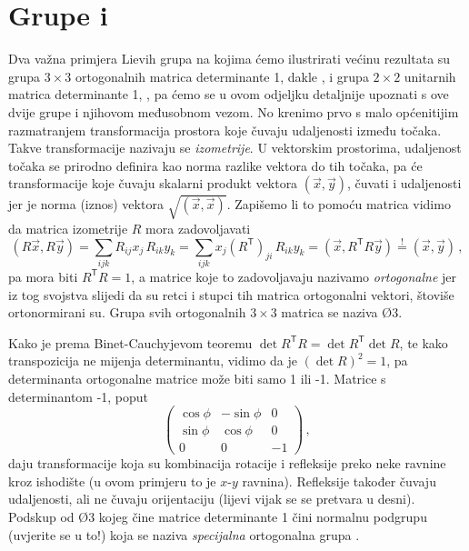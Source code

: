 \section{Grupe  i }
\label{sec:so3su2}

Dva važna primjera Lievih grupa na kojima  ćemo ilustrirati većinu rezultata
su grupa $3 \times 3$ ortogonalnih matrica determinante 1, dakle ,
i grupa $2 \times 2$ unitarnih matrica determinante 1, , pa ćemo
se u ovom odjeljku detaljnije upoznati s ove dvije grupe i njihovom
međusobnom vezom. No krenimo prvo
s malo općenitijim razmatranjem transformacija prostora koje
čuvaju udaljenosti između točaka.
Takve transformacije nazivaju se \emph{izometrije}. U vektorskim prostorima,
udaljenost točaka se prirodno definira kao norma razlike vektora do tih točaka,
pa će transformacije koje čuvaju skalarni produkt vektora $(\vec{x}, \vec{y})$,
čuvati i udaljenosti jer je norma (iznos) vektora $\sqrt{(\vec{x}, \vec{x})}$.
Zapišemo li to pomoću matrica vidimo da matrica izometrije $R$ mora zadovoljavati
\begin{equation}
    (R\vec{x}, R\vec{y}) = \sum_{ijk} R_{ij}x_{j} \, R_{ik} y_{k} = \sum_{ijk} x_{j} (R^\mathsf{T})_{ji}
    \, R_{ik} y_{k} = (\vec{x}, R^{\mathsf{T}} R \vec{y}) \stackrel{!}{=} (\vec{x}, \vec{y}) \,,
\end{equation}
pa mora biti $R^{\mathsf{T}} R = 1$, a matrice koje to zadovoljavaju
nazivamo \emph{ortogonalne} jer iz tog svojstva slijedi da su retci i stupci
tih matrica ortogonalni vektori, štoviše ortonormirani su. Grupa svih
ortogonalnih $3 \times 3$ matrica se naziva \O{3}.

Kako je prema Binet-Cauchyjevom teoremu $\det R^\mathsf{T} R = \det R^\mathsf{T} \det R$,
te kako transpozicija ne mijenja determinantu, vidimo da je $(\det R)^2 = 1$,
pa determinanta ortogonalne matrice može biti samo 1 ili -1.
Matrice s determinantom -1, poput 
\begin{equation}
\begin{pmatrix}
\cos\phi & -\sin\phi & 0 \\
\sin\phi & \cos\phi & 0 \\
0 & 0 & -1 \end{pmatrix} \,,
\end{equation}
daju transformacije koja su kombinacija rotacije i refleksije preko
neke ravnine kroz ishodište (u ovom primjeru to je $x$-$y$ ravnina).
Refleksije također čuvaju
udaljenosti, ali ne čuvaju orijentaciju (lijevi vijak se
se pretvara u desni). Podskup od \O{3} kojeg čine
matrice determinante 1 čini normalnu podgrupu (uvjerite se u to!)
koja se naziva \emph{specijalna} ortogonalna grupa .

